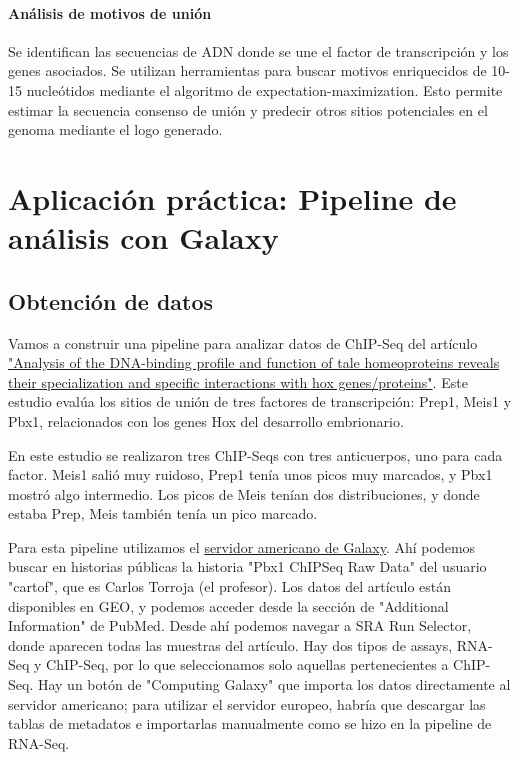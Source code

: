 \paragraph{Análisis de motivos de unión}
Se identifican las secuencias de ADN donde se une el factor de transcripción y los genes asociados.
Se utilizan herramientas para buscar motivos enriquecidos de 10-15 nucleótidos mediante el algoritmo de expectation-maximization.
Esto permite estimar la secuencia consenso de unión y predecir otros sitios potenciales en el genoma mediante el logo generado.

\section{Aplicación práctica: Pipeline de análisis con Galaxy}
\subsection{Obtención de datos}
Vamos a construir una pipeline para analizar datos de ChIP-Seq del artículo \href{https://www.sciencedirect.com/science/article/pii/S2211124713001368?via\%3Dihub}{"Analysis of the DNA-binding profile and function of tale homeoproteins reveals their specialization and specific interactions with hox genes/proteins"}. Este estudio evalúa los sitios de unión de tres factores de transcripción: Prep1, Meis1 y Pbx1, relacionados con los genes Hox del desarrollo embrionario.

En este estudio se realizaron tres ChIP-Seqs con tres anticuerpos, uno para cada factor. Meis1 salió muy ruidoso, Prep1 tenía unos picos muy marcados, y Pbx1 mostró algo intermedio. Los picos de Meis tenían dos distribuciones, y donde estaba Prep, Meis también tenía un pico marcado. 

Para esta pipeline utilizamos el \href{https://usegalaxy.org/}{servidor americano de Galaxy}. Ahí podemos buscar en historias públicas la historia "Pbx1 ChIPSeq Raw Data" del usuario "cartof", que es Carlos Torroja (el profesor). Los datos del artículo están disponibles en GEO, y podemos acceder desde la sección de "Additional Information" de PubMed. Desde ahí podemos navegar a SRA Run Selector, donde aparecen todas las muestras del artículo. Hay dos tipos de assays, RNA-Seq y ChIP-Seq, por lo que seleccionamos solo aquellas pertenecientes a ChIP-Seq. Hay un botón de "Computing Galaxy" que importa los datos directamente al servidor americano; para utilizar el servidor europeo, habría que descargar las tablas de metadatos e importarlas manualmente como se hizo en la pipeline de RNA-Seq.

